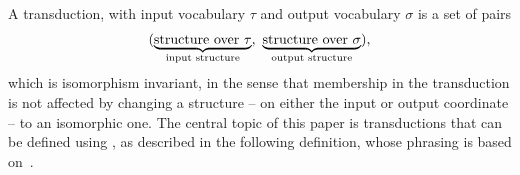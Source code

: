  A transduction, with input vocabulary $\tau$ and output vocabulary $\sigma$ is a set of pairs 
\begin{align*}
    (\myunderbrace{\text{structure over $\tau$}}{input structure}, \ 
    \myunderbrace{\text{structure over $\sigma$}}{output structure}),
\end{align*}
which is isomorphism invariant, in the sense that membership in the transduction is not affected by changing a structure -- on either the input or output coordinate -- to an isomorphic one. The central topic of this paper is transductions that can be defined using \mso, as described in the following definition, whose phrasing is based on~\cite[p.~9--10]{bojanczykOptimizingTreeDecompositions2017a}. 

